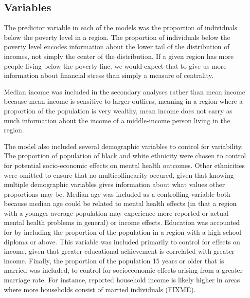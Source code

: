 \documentclass{article}
\begin{document}
\subsection{Variables}\label{sec:finalvars}

The predictor variable in each of the
models was the proportion of individuals below the poverty level in a region.
The proportion of individuals below the
poverty level encodes information about the lower tail of the
distribution of incomes, not simply the center of the distribution.
If a given region has more people living below the poverty line, we
would expect that to give us more information about financial stress
than simply a measure of centrality.

Median income was included in the secondary analyses rather than mean
income because mean income is sensitive to larger outliers, meaning in a
region where a proportion of the population is very wealthy, mean income
does not carry as much information about the income of a middle-income person
living in the region.

The model also included several demographic variables to control for
variability.
The proportion of population of black and white ethnicity
were chosen to control for potential socio-economic
effects on mental health outcomes. Other ethnicities were omitted to
ensure that no multicollinearity occured, given that knowing
multiple demographic variables gives information about what values other
proportions may be.
Median age was included as a controlling variable
both because median age could be related to mental health effects (in
that a region with a younger average population may experience more
reported or actual mental health problems in general) or income effects.
Education was accounted for by including the proportion of the
population in a region with a high school diploma or above. This
variable was included primarily to control for effects on income, given
that greater educational achievement is correlated with greater income.
Finally, the proportion of the population 15 years or older that is
married was included, to control for socioeconomic effects arising from
a greater marriage rate. For instance, reported household income is
likely higher in areas where more households consist of married
individuals (FIXME).

%
%
\end{document}
